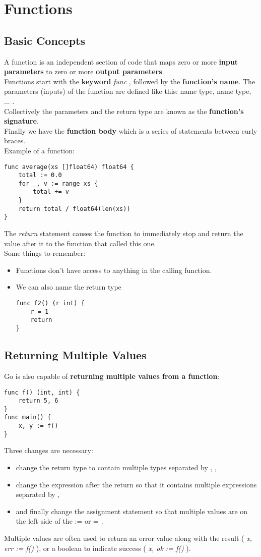 \documentclass[10pt,letterpaper]{report}
\begin{document}
\chapter{Functions}
\section{Basic Concepts}
A function is an independent section of code that maps zero or more \textbf{input parameters} to zero or more \textbf{output parameters}.\\
Functions start with the \textbf{keyword} \textit{func} , followed by the \textbf{function's name}. The parameters (inputs) of the function are defined like this: name type, name type, ... .\\
Collectively the parameters and the return type are known as the \textbf{function's signature}.\\
Finally we have the \textbf{function body} which is a series of statements between curly braces.\\
Example of a function:
\begin{lstlisting}
func average(xs []float64) float64 {
	total := 0.0
	for _, v := range xs {
		total += v
	}
	return total / float64(len(xs))
}
\end{lstlisting}
The \textit{return} statement causes the function to immediately stop and return the value after it to the function that called this one.\\
Some things to remember:
\begin{itemize}
\item Functions don't have access to anything in the calling function.
\item We can also name the return type
\begin{lstlisting}
func f2() (r int) {
	r = 1
	return
}
\end{lstlisting}
\end{itemize}
\section{Returning Multiple Values}
Go is also capable of \textbf{returning multiple values from a function}:
\begin{lstlisting}
func f() (int, int) {
	return 5, 6
}
func main() {
	x, y := f()
}
\end{lstlisting}
Three changes are necessary:
\begin{itemize}
\item change the return type to contain multiple types separated by , , 
\item change the expression after the return so that it contains multiple expressions separated by ,
\item and finally change the assignment statement so that multiple values are on the left side of the := or = .
\end{itemize}
Multiple values are often used to return an error value along with the result ( \textit{x, err := f()} ), or a boolean to indicate success ( \textit{x, ok := f()} ).
\end{document}
